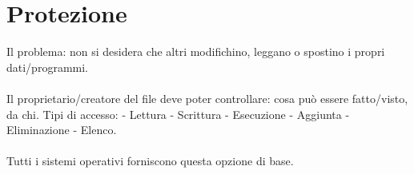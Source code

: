 \section{Protezione}

Il problema:
non si desidera che altri modifichino, leggano o spostino i propri dati/programmi.

\paragraph{}
 
Il proprietario/creatore del file deve poter controllare: cosa può essere fatto/visto, da chi.
Tipi di accesso: - Lettura - Scrittura - Esecuzione - Aggiunta - Eliminazione - Elenco.

\paragraph{}
Tutti i sistemi operativi forniscono questa opzione di base.
